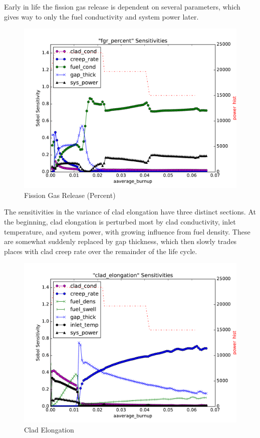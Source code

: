 \documentclass{anstrans} \usepackage{amsmath} \usepackage{amssymb}
\begin{document}
Early in life the fission gas release is dependent on several parameters, which gives way to only the fuel
conductivity and system power later.
\begin{figure}
  \centering
  \includegraphics[width=\linewidth]{./sens_fgr_percent}
  \caption{Fission Gas Release (Percent)}
  \label{fig:fgr}
\end{figure}

The sensitivities in the variance of clad elongation have three distinct sections.  At the beginning, clad
elongation is perturbed most by clad conductivity, inlet temperature, and system power, with growing influence
from fuel density.  These are somewhat suddenly replaced by gap thickness, which then slowly trades places
with clad creep rate over the remainder of the life cycle.
\begin{figure}
  \centering
  \includegraphics[width=\linewidth]{./sens_clad_elongation}
  \caption{Clad Elongation}
  \label{fig:elong}
\end{figure}
\end{document}
